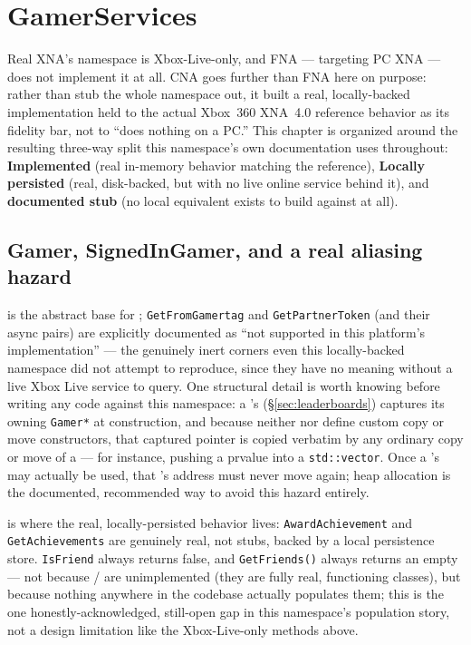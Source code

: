 \chapter{GamerServices}
\label{ch:gamerservices}

Real XNA's  namespace is Xbox-Live-only, and FNA --- targeting PC XNA
--- does not implement it at all. CNA goes further than FNA here on purpose: rather than
stub the whole namespace out, it built a real, locally-backed implementation held to the
actual Xbox~360 XNA~4.0 reference behavior as its fidelity bar, not to ``does nothing on a
PC.'' This chapter is organized around the resulting three-way split this namespace's own
documentation uses throughout: \textbf{Implemented} (real in-memory behavior matching the
reference), \textbf{Locally persisted} (real, disk-backed, but with no live online service
behind it), and \textbf{documented stub} (no local equivalent exists to build against at
all).

\section{Gamer, SignedInGamer, and a real aliasing hazard}

 is the abstract base for ; \texttt{GetFromGamertag}
and \texttt{GetPartnerToken} (and their async pairs) are explicitly documented as ``not
supported in this platform's implementation'' --- the genuinely inert corners even this
locally-backed namespace did not attempt to reproduce, since they have no meaning without a
live Xbox Live service to query. One structural detail is worth knowing before writing any
code against this namespace: a 's 
(\S\ref{sec:leaderboards}) captures its owning \texttt{Gamer*} at construction, and because
neither  nor  define custom copy or move
constructors, that captured pointer is copied verbatim by any ordinary copy or move of a
 --- for instance, pushing a prvalue into a \texttt{std::vector}. Once a
's  may actually be used, that 's
address must never move again; heap allocation is the documented, recommended way to avoid
this hazard entirely.

 is where the real, locally-persisted behavior lives:
\texttt{AwardAchievement} and \texttt{GetAchievements} are genuinely real, not stubs, backed
by a local persistence store. \texttt{IsFriend} always returns false, and
\texttt{GetFriends()} always returns an empty  --- not because
 /  are unimplemented (they are fully real,
functioning classes), but because nothing anywhere in the codebase actually populates them;
this is the one honestly-acknowledged, still-open gap in this namespace's population story,
not a design limitation like the Xbox-Live-only methods above.

